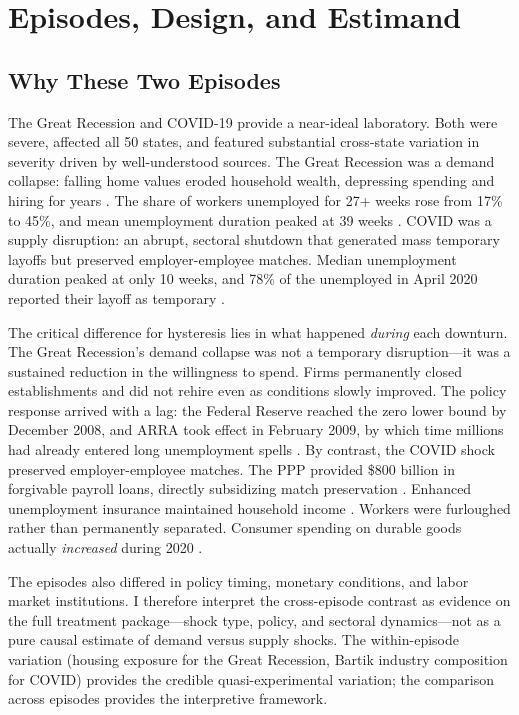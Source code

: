 \documentclass[12pt]{article}
\begin{document}
\section{Episodes, Design, and Estimand}
\label{sec:design}

\subsection{Why These Two Episodes}

The Great Recession and COVID-19 provide a near-ideal laboratory. Both were severe, affected all 50 states, and featured substantial cross-state variation in severity driven by well-understood sources. The Great Recession was a demand collapse: falling home values eroded household wealth, depressing spending and hiring for years \citep{mian2014explains}. The share of workers unemployed for 27+ weeks rose from 17\% to 45\%, and mean unemployment duration peaked at 39 weeks \citep{kroft2016long}. COVID was a supply disruption: an abrupt, sectoral shutdown that generated mass temporary layoffs but preserved employer-employee matches. Median unemployment duration peaked at only 10 weeks, and 78\% of the unemployed in April 2020 reported their layoff as temporary \citep{fujita2017recall, cajner2020us}.

The critical difference for hysteresis lies in what happened \textit{during} each downturn. The Great Recession's demand collapse was not a temporary disruption---it was a sustained reduction in the willingness to spend. Firms permanently closed establishments and did not rehire even as conditions slowly improved. The policy response arrived with a lag: the Federal Reserve reached the zero lower bound by December 2008, and ARRA took effect in February 2009, by which time millions had already entered long unemployment spells \citep{elsby2010labor}. By contrast, the COVID shock preserved employer-employee matches. The PPP provided \$800 billion in forgivable payroll loans, directly subsidizing match preservation \citep{autor2022paycheck}. Enhanced unemployment insurance maintained household income \citep{ganong2020us}. Workers were furloughed rather than permanently separated. Consumer spending on durable goods actually \textit{increased} during 2020 \citep{guerrieri2022macroeconomic}.

The episodes also differed in policy timing, monetary conditions, and labor market institutions. I therefore interpret the cross-episode contrast as evidence on the full treatment package---shock type, policy, and sectoral dynamics---not as a pure causal estimate of demand versus supply shocks. The within-episode variation (housing exposure for the Great Recession, Bartik industry composition for COVID) provides the credible quasi-experimental variation; the comparison across episodes provides the interpretive framework.
\end{document}
